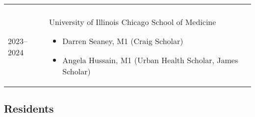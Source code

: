 \documentclass[10pt,a4paper,]{article}
\begin{document}
\begin{longtable}{@{\extracolsep{\fill}}ll}
{\vspace{\parsep}}\\
2023--2024 & \parbox[t]{0.85\textwidth}{%
\textbf{}\hfill{\footnotesize }\newline
  University of Illinois Chicago School of Medicine\par%
  \vspace{0.1cm}\begin{minipage}{0.7\textwidth}%
\begin{itemize}%
\item Darren Seaney, M1 (Craig Scholar)%
\item Angela Hussain, M1 (Urban Health Scholar, James Scholar)%
\end{itemize}%
\end{minipage}%
\vspace{\parsep}}\\
\end{longtable}

\hypertarget{residents}{%
\subsection{Residents}\label{residents}}
\end{document}
